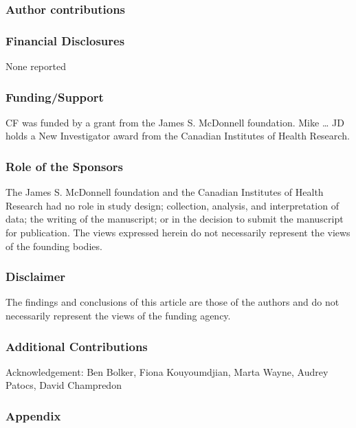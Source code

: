 \documentclass[12pt,]{article}
\begin{document}
\subsubsection{Author contributions}\label{author-contributions}

\subsubsection{Financial Disclosures}\label{financial-disclosures}

None reported

\subsubsection{Funding/Support}\label{fundingsupport}

CF was funded by a grant from the James S. McDonnell foundation. Mike
\ldots{} JD holds a New Investigator award from the Canadian Institutes
of Health Research.

\subsubsection{Role of the Sponsors}\label{role-of-the-sponsors}

The James S. McDonnell foundation and the Canadian Institutes of Health
Research had no role in study design; collection, analysis, and
interpretation of data; the writing of the manuscript; or in the
decision to submit the manuscript for publication. The views expressed
herein do not necessarily represent the views of the founding bodies.

\subsubsection{Disclaimer}\label{disclaimer}

The findings and conclusions of this article are those of the authors
and do not necessarily represent the views of the funding agency.

\subsubsection{Additional Contributions}\label{additional-contributions}

Acknowledgement: Ben Bolker, Fiona Kouyoumdjian, Marta Wayne, Audrey
Patocs, David Champredon

\subsubsection{Appendix}\label{appendix}
\end{document}
